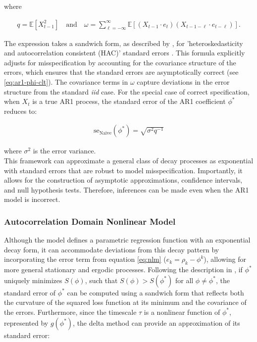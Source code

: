 \documentclass[main.tex]{subfiles}
\begin{document}
\noindent where

\begin{align}
    q = \mathbb{E}[X_{t-1}^2] \quad\text{and}\quad \omega = \sum_{\ell=-\infty}^{\infty} \mathbb{E}[(X_{t-1} \cdot e_t)(X_{t-1-\ell} \cdot e_{t-\ell})].
\end{align}

The expression takes a sandwich form, as described by \citet{newey_simple_1987}, for 'heteroskedasticity and autocorrelation consistent (HAC)' standard errors \citep[theorem 14.32]{hansen_econometrics_2022}. This formula explicitly adjusts for misspecification by accounting for the covariance structure of the errors, which ensures that the standard errors are asymptotically correct (see \eqref{eq:ar1-phi-clt}). The covariance terms in $\omega$ capture deviations in the error structure from the standard \textit{iid} case. For the special case of correct specification, when $X_t$ is a true AR1 process, the standard error of the AR1 coefficient $\phi^*$ reduces to:

\begin{align}
    \text{se}_{\text{Naive}}(\phi^*) = \sqrt{\sigma^2 q^{-1}}
\end{align}

\noindent where $\sigma^2$ is the error variance. \\

This framework can approximate a general class of decay processes as exponential with standard errors that are robust to model misspecification. Importantly, it allows for the construction of asymptotic approximations, confidence intervals, and null hypothesis tests. Therefore, inferences can be made even when the AR1 model is incorrect.

\subsubsection{Autocorrelation Domain Nonlinear Model}

Although the model defines a parametric regression function with an exponential decay form, it can accommodate deviations from this decay pattern by incorporating the error term from equation \eqref{eq:nlm} ($e_k = \rho_k - \phi^k$), allowing for more general stationary and ergodic processes. Following the description in \citet[chapter~22.8, chapter~23.5]{hansen_econometrics_2022}, if $\phi^*$ uniquely minimizes $S(\phi)$, such that $S(\phi) > S(\phi^*)$ for all $\phi \neq \phi^*$, the standard error of $\phi^*$ can be computed using a sandwich form that reflects both the curvature of the squared loss function at its minimum and the covariance of the errors. Furthermore, since the timescale $\tau$ is a nonlinear function of $\phi^*$, represented by $g(\phi^*)$, the delta method can provide an approximation of its standard error:
\end{document}

